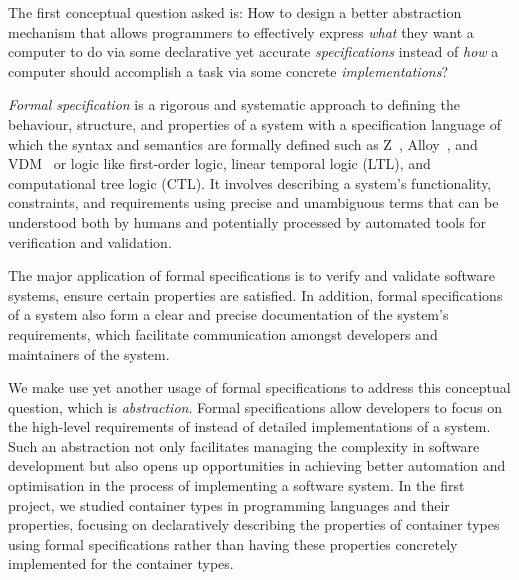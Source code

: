 
\begin{center}
\vspace{-0.7em}
\vspace{-0.3em}
\end{center}

The first conceptual question asked is: 
How to design a better abstraction mechanism that allows programmers to effectively express \emph{what} they want a computer to do via some declarative yet accurate \emph{specifications} instead of \emph{how} a computer should accomplish a task via some concrete \emph{implementations}?

\emph{Formal specification} is a rigorous and systematic approach to defining the behaviour, structure, and properties of a system with a specification language of which the syntax and semantics are formally defined such as Z~\citep{znotation}, Alloy~\citep{alloy}, and VDM~\citep{vdm} or logic like first-order logic, linear temporal logic (LTL), and computational tree logic (CTL). It involves describing a system's functionality, constraints, and requirements using precise and unambiguous terms that can be understood both by humans and potentially processed by automated tools for verification and validation.

The major application of formal specifications is to verify and validate software systems, ensure certain properties are satisfied. In addition, formal specifications of a system also form a clear and precise documentation of the system's requirements, which facilitate communication amongst developers and maintainers of the system.

We make use yet another usage of formal specifications to address this conceptual question, which is \emph{abstraction}. Formal specifications allow developers to focus on the high-level requirements of instead of detailed implementations of a system. Such an abstraction not only facilitates managing the complexity in software development but also opens up opportunities in achieving better automation and optimisation in the process of implementing a software system. In the first project, we studied container types in programming languages and their properties, focusing on declaratively describing the properties of container types using formal specifications rather than having these properties concretely implemented for the container types.

